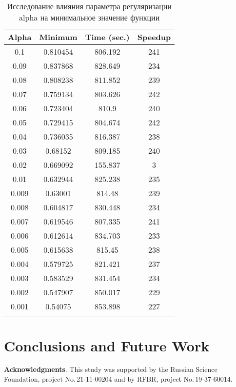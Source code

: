 \documentclass{svproc}
\begin{document}
\begin{table}
\caption{Исследование влияния параметра регуляризации alpha на минимальное значение функции}
\label{table_1}
\begin{center}
\begin{tabular}{cccc}
\hline\noalign{\smallskip}
 Alpha      & Minimum  & Time (sec.) & Speedup \\
\hline\noalign{\smallskip}
0.1		&	0.810454	&	806.192	&	241       \\
0.09	&	0.837868	&	828.649	&	234       \\
0.08	&	0.808238	&	811.852	&	239       \\
0.07	&	0.759134	&	803.626	&	242       \\
0.06	&	0.723404	&	810.9	&	240       \\
0.05	&	0.729415	&	804.674	&	242       \\
0.04	&	0.736035	&	816.387	&	238       \\
0.03	&	0.68152		&	809.185	&	240       \\
0.02	&	0.669092	&	155.837	&	3         \\
0.01	&	0.632944	&	825.238	&	235       \\
0.009	&	0.63001		&	814.48	&	239       \\
0.008	&	0.604817	&	830.448	&	234       \\
0.007	&	0.619546	&	807.335	&	241       \\
0.006	&	0.612614	&	834.703	&	233       \\
0.005	&	0.615638	&	815.45	&	238       \\
0.004	&	0.579725	&	821.421	&	237       \\
0.003	&	0.583529	&	831.454	&	234       \\
0.002	&	0.547907	&	850.017	&	229       \\
0.001	&	0.54075		&	853.898	&	227       \\
\noalign{\smallskip}\hline
\end{tabular}\end{center}\end{table}



\section{Conclusions and Future Work}



\medskip

\textbf{Acknowledgments}. This study was supported by the Russian Science Foundation, project No.\,21-11-00204 and by RFBR, project No.\,19-37-60014.

%
%

{}
\end{document}
